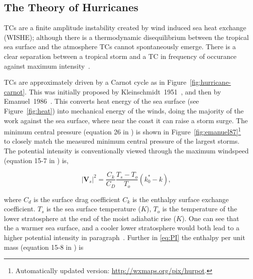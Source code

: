 
\subsection{The Theory of Hurricanes}
\label{sec:hurr-theory}

\label{sec:cyclogenesis}
TCs are a finite amplitude instability created by
wind induced sea heat exchange (WISHE);
although there is a thermodynamic disequilibrium between the tropical sea
surface and the atmosphere TCs cannot spontaneously emerge. There is
a clear separation between a tropical storm and a TC
in frequency of occurance against maximum intensity~\cite{emanuel2005divine}.


\label{sec:carnot}





TCs are approximately driven by a Carnot cycle as in Figure~\ref{fig:hurricane-carnot}.
This was initially proposed by Kleinschmidt~1951~\cite{kleinschmidt1951grundlagen},
and then by Emanuel~1986~\cite{emanuel1986air, emanuel1987dependence, lilly1985steady,}.
This converts heat energy of the sea surface
(see Figure~\ref{fig:heat}) into
mechanical energy of the winds, doing the majority of the work against the sea surface,
 where near the coast it can raise a storm surge.
 The minimum central pressure (equation 26 in \cite{emanuel1986air}) is
 shown in Figure~\ref{fig:emanuel87}\footnote{Automatically updated version: \url{http://wxmaps.org/pix/hurpot}.}
 to closely match the measured
minimum central pressure of the largest storms.
The potential intensity is conventionally viewed through the
maximum windspeed (equation 15-7 in \cite{emanuel2018progress}) is,

\begin{equation}
\left|\mathbf{V}_{s}\right|^{2}=\frac{C_{k}}{C_{D}}
\frac{T_{s}-T_{o}}{T_{o}}\left(k_{0}^{*}-k\right),
\tag{PI}
\label{eq:PI}
\end{equation}

where $C_d$ is the surface drag coefficient $C_k$ is the
 enthalpy surface exchange coefficient.
$T_s$ is the sea surface temperature ($K$), $T_o$ is the temperature of the
lower stratosphere at the end of the moist adiabatic rise ($K$).
One can see that the a warmer sea surface, and a cooler lower stratosphere
would both lead to a higher potential intensity in paragraph~\cite{emanuel1991theory, emanuel2018progress}.
Further in \ref{eq:PI} the enthalpy per unit mass (equation 15-8 in \cite{emanuel2018progress}) is


